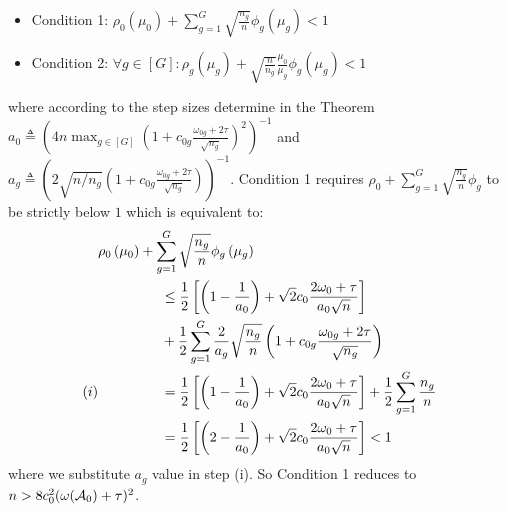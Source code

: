 	\begin{itemize}
		\item Condition 1: $\rho_0\left(\mu_0\right) + \sum_{g=1}^{G} \sqrt{\frac{n_g}{n}} \phi_g\left(\mu_g\right) < 1$
		\item Condition 2: $\forall g \in [G]: \rho_g\left(\mu_g\right) + \sqrt{\frac{n}{n_g}} \frac{\mu_0}{\mu_g}\phi_g\left(\mu_g\right) < 1$
	\end{itemize}
	where according to the step sizes determine in the Theorem $a_0 \triangleq (4n\max_{g \in [G]}(1 + c_{0g}\frac{\omega_{0g} + 2\tau}{\sqrt{n_g}})^{2})^{-1}$ and $a_g \triangleq (2 \sqrt{n / n_g}(1 + c_{0g}\frac{\omega_{0g} + 2\tau}{\sqrt{n_g}}))^{-1}$.
	Condition 1 requires $\rho_0 + \sum_{g=1}^{G} \sqrt{\frac{n_g}{n}} \phi_g$ to be strictly below $1$ which is equivalent to: 
	\begin{align}	 
	\nonumber 
	&\rho_0\left(\mu_0\right) + \sum_{g=1}^{G} \sqrt{\frac{n_g}{n}} \phi_g\left(\mu_g\right) 
	\\ \nonumber 
	&\hspace*{45pt}\leq  \frac{1}{2}  \left[\left(1 - \frac{1}{a_0} \right) + \sqrt{2} c_0\frac{2 \omega_0 + \tau}{a_0 \sqrt{n}} \right] 
	\\ \nonumber 
	&\hspace*{45pt}+ \frac{1}{2} \sum_{g=1}^{G} \frac{2}{a_g}  \sqrt{\frac{n_g}{n}} \left(1 + c_{0g}\frac{\omega_{0g} + 2\tau}{\sqrt{n_g}} \right)
	\\ \nonumber 
	(i) &\hspace*{45pt}= \frac{1}{2}  \left[\left(1 - \frac{1}{a_0} \right) + \sqrt{2} c_0\frac{2 \omega_0 + \tau}{a_0 \sqrt{n}} \right] + \frac{1}{2} \sum_{g=1}^{G} \frac{n_g}{n} 
	\\ \nonumber 
	&\hspace*{45pt}=\frac{1}{2}  \left[\left(2 - \frac{1}{a_0} \right) + \sqrt{2} c_0\frac{2 \omega_0 + \tau}{a_0 \sqrt{n}} \right]  < 1
	\end{align}
	where we substitute $a_g$ value in step (i).
	So Condition 1 reduces to $n > 8 c_0^2 (\omega(\cA_0) + \tau)^2$. 
	
